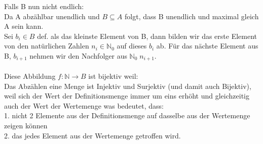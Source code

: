 \documentclass[paper = a4, ngerman]{scrartcl}
\begin{document}
Falls B nun nicht endlich:\\
Da A abzählbar unendlich und $B \subseteq A$  folgt, dass B unendlich und maximal gleich A sein kann.\\
 Sei $b_i \in B$ def. als das kleinste Element von B, dann bilden wir das erste Element von den natürlichen Zahlen $n_i \in \mathbb{N}_{0}$ auf dieses $b_i$ ab. Für das nächste Element aus B, $b_{i+1}$ nehmen wir den Nachfolger aus $\mathbb{N}_{0}\; n_{i+1}$.\\\\
 Diese Abbildung $f: \mathbb{N} \rightarrow B$ ist bijektiv weil:\\
 Das Abzählen eine Menge ist Injektiv und Surjektiv (und damit auch Bijektiv), weil sich der Wert der Definitionsmenge immer um eins erhöht und gleichzeitig auch der Wert der Wertemenge was bedeutet, dass:\\ 1. nicht 2 Elemente aus der Definitionsmenge auf dasselbe aus der Wertemenge zeigen können\\
 2. das jedes Element aus der Wertemenge getroffen wird. 
 
	

	
	
\end{document}
